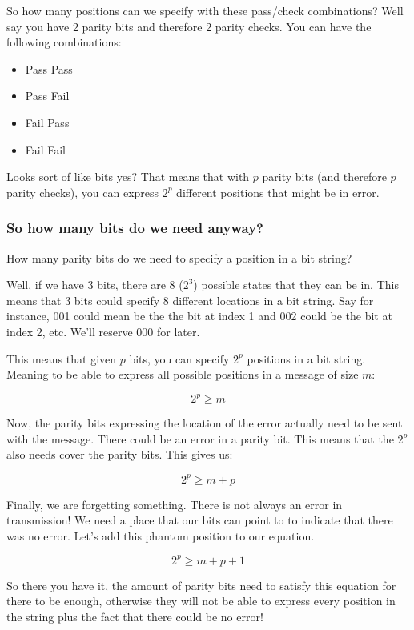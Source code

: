 \documentclass{article}
\begin{document}
  So how many positions can we specify with these pass/check combinations? Well say you have 2 parity bits and therefore 2 parity checks. You can have the following combinations:

  \begin{itemize}
    \item Pass Pass
    \item Pass Fail
    \item Fail Pass
    \item Fail Fail
  \end{itemize}

  Looks sort of like bits yes? That means that with $p$ parity bits (and therefore $p$ parity checks), you can express $2^p$ different positions that might be in error.

  \subsubsection*{So how many bits do we need anyway?}
  How many parity bits do we need to specify a position in a bit string?

  Well, if we have 3 bits, there are 8 ($2^3$) possible states that they can be in. This means that 3 bits could specify 8 different locations in a bit string. Say for instance, 001 could mean be the the bit at index 1 and 002 could be the bit at index 2, etc. We'll reserve 000 for later.

  This means that given $p$ bits, you can specify $2^p$ positions in a bit string. Meaning to be able to express all possible positions in a message of size $m$:

  \[ 2^p \geq m \]

  Now, the parity bits expressing the location of the error actually need to be sent with the message. There could be an error in a parity bit. This means that the $2^p$ also needs cover the parity bits. This gives us:

  \[ 2^p \geq m + p \]

  Finally, we are forgetting something. There is not always an error in transmission! We need a place that our bits can point to to indicate that there was no error. Let's add this phantom position to our equation.

  \[ 2^p \geq m + p + 1 \]

  So there you have it, the amount of parity bits need to satisfy this equation for there to be enough, otherwise they will not be able to express every position in the string plus the fact that there could be no error!
\end{document}
